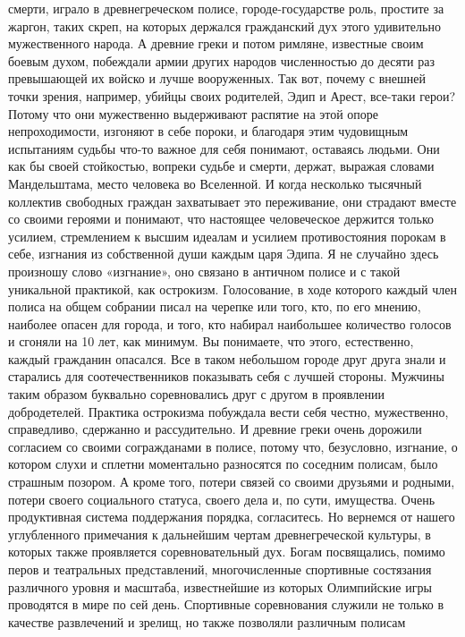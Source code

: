 смерти, играло в древнегреческом полисе, городе-государстве роль, простите за
жаргон, таких скреп, на которых держался гражданский дух этого удивительно
мужественного народа. А древние греки и потом римляне, известные своим боевым
духом, побеждали армии других народов численностью до десяти раз превышающей их
войско и лучше вооруженных. Так вот, почему с внешней точки зрения, например,
убийцы своих родителей, Эдип и Арест, все-таки герои? Потому что они мужественно
выдерживают распятие на этой опоре непроходимости, изгоняют в себе пороки, и
благодаря этим чудовищным испытаниям судьбы что-то важное для себя понимают,
оставаясь людьми. Они как бы своей стойкостью, вопреки судьбе и смерти, держат,
выражая словами Мандельштама, место человека во Вселенной. И когда несколько
тысячный коллектив свободных граждан захватывает это переживание, они страдают
вместе со своими героями и понимают, что настоящее человеческое держится только
усилием, стремлением к высшим идеалам и усилием противостояния порокам в себе,
изгнания из собственной души каждым царя Эдипа. Я не случайно здесь произношу
слово «изгнание», оно связано в античном полисе и с такой уникальной практикой,
как острокизм. Голосование, в ходе которого каждый член полиса на общем собрании
писал на черепке или того, кто, по его мнению, наиболее опасен для города, и
того, кто набирал наибольшее количество голосов и сгоняли на 10 лет, как
минимум. Вы понимаете, что этого, естественно, каждый гражданин опасался. Все в
таком небольшом городе друг друга знали и старались для соотечественников
показывать себя с лучшей стороны. Мужчины таким образом буквально соревновались
друг с другом в проявлении добродетелей. Практика острокизма побуждала вести
себя честно, мужественно, справедливо, сдержанно и рассудительно. И древние
греки очень дорожили согласием со своими согражданами в полисе, потому что,
безусловно, изгнание, о котором слухи и сплетни моментально разносятся по
соседним полисам, было страшным позором. А кроме того, потери связей со своими
друзьями и родными, потери своего социального статуса, своего дела и, по сути,
имущества. Очень продуктивная система поддержания порядка, согласитесь. Но
вернемся от нашего углубленного примечания к дальнейшим чертам древнегреческой
культуры, в которых также проявляется соревновательный дух. Богам посвящались,
помимо перов и театральных представлений, многочисленные спортивные состязания
различного уровня и масштаба, известнейшие из которых Олимпийские игры
проводятся в мире по сей день. Спортивные соревнования служили не только в
качестве развлечений и зрелищ, но также позволяли различным полисам
